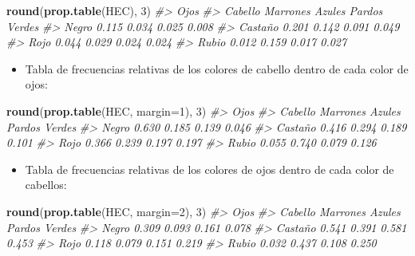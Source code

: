 \documentclass[
]{book}
\newenvironment{Shaded}{\begin{snugshade}}{\end{snugshade}}
\newcommand{\CommentTok}[1]{\textcolor[rgb]{0.56,0.35,0.01}{\textit{#1}}}
\newcommand{\DataTypeTok}[1]{\textcolor[rgb]{0.13,0.29,0.53}{#1}}
\newcommand{\DecValTok}[1]{\textcolor[rgb]{0.00,0.00,0.81}{#1}}
\newcommand{\KeywordTok}[1]{\textcolor[rgb]{0.13,0.29,0.53}{\textbf{#1}}}
\newcommand{\NormalTok}[1]{#1}
\providecommand{\tightlist}{%
  \setlength{\itemsep}{0pt}\setlength{\parskip}{0pt}}
\theoremstyle{definition}
\theoremstyle{definition}
\theoremstyle{definition}
\theoremstyle{remark}
\begin{document}
\begin{Shaded}
\begin{Highlighting}[]
\KeywordTok{round}\NormalTok{(}\KeywordTok{prop.table}\NormalTok{(HEC), }\DecValTok{3}\NormalTok{)  }
\CommentTok{\#\textgreater{}          Ojos}
\CommentTok{\#\textgreater{} Cabello   Marrones Azules Pardos Verdes}
\CommentTok{\#\textgreater{}   Negro      0.115  0.034  0.025  0.008}
\CommentTok{\#\textgreater{}   Castaño    0.201  0.142  0.091  0.049}
\CommentTok{\#\textgreater{}   Rojo       0.044  0.029  0.024  0.024}
\CommentTok{\#\textgreater{}   Rubio      0.012  0.159  0.017  0.027}
\end{Highlighting}
\end{Shaded}

\begin{itemize}
\tightlist
\item
  Tabla de frecuencias relativas de los colores de cabello dentro de cada color de ojos:
\end{itemize}

\begin{Shaded}
\begin{Highlighting}[]
\KeywordTok{round}\NormalTok{(}\KeywordTok{prop.table}\NormalTok{(HEC, }\DataTypeTok{margin=}\DecValTok{1}\NormalTok{), }\DecValTok{3}\NormalTok{)  }
\CommentTok{\#\textgreater{}          Ojos}
\CommentTok{\#\textgreater{} Cabello   Marrones Azules Pardos Verdes}
\CommentTok{\#\textgreater{}   Negro      0.630  0.185  0.139  0.046}
\CommentTok{\#\textgreater{}   Castaño    0.416  0.294  0.189  0.101}
\CommentTok{\#\textgreater{}   Rojo       0.366  0.239  0.197  0.197}
\CommentTok{\#\textgreater{}   Rubio      0.055  0.740  0.079  0.126}
\end{Highlighting}
\end{Shaded}

\begin{itemize}
\tightlist
\item
  Tabla de frecuencias relativas de los colores de ojos dentro de cada color de cabellos:
\end{itemize}

\begin{Shaded}
\begin{Highlighting}[]
\KeywordTok{round}\NormalTok{(}\KeywordTok{prop.table}\NormalTok{(HEC, }\DataTypeTok{margin=}\DecValTok{2}\NormalTok{), }\DecValTok{3}\NormalTok{)   }
\CommentTok{\#\textgreater{}          Ojos}
\CommentTok{\#\textgreater{} Cabello   Marrones Azules Pardos Verdes}
\CommentTok{\#\textgreater{}   Negro      0.309  0.093  0.161  0.078}
\CommentTok{\#\textgreater{}   Castaño    0.541  0.391  0.581  0.453}
\CommentTok{\#\textgreater{}   Rojo       0.118  0.079  0.151  0.219}
\CommentTok{\#\textgreater{}   Rubio      0.032  0.437  0.108  0.250}
\end{Highlighting}
\end{Shaded}
\end{document}

